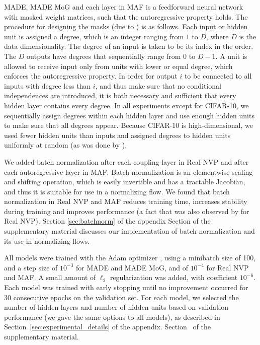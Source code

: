 MADE, MADE MoG and each layer in MAF is a feedforward neural network with masked weight matrices, such that the autoregressive property holds. The procedure for designing the masks (due to \citet{Germain:2015}) is as follows. Each input or hidden unit is assigned a degree, which is an integer ranging from $1$ to $D$, where $D$ is the data dimensionality. The degree of an input is taken to be its index in the order. The $D$ outputs have degrees that sequentially range from $0$ to $D\!-\!1$. A unit is allowed to receive input only from units with lower or equal degree, which enforces the autoregressive property. In order for output $i$ to be connected to all inputs with degree less than $i$, and thus make sure that no conditional independences are introduced, it is both necessary and sufficient that every hidden layer contains every degree. In all experiments except for CIFAR-10, we sequentially assign degrees within each hidden layer and use enough hidden units to make sure that all degrees appear. Because CIFAR-10 is high-dimensional, we used fewer hidden units than inputs and assigned degrees to hidden units uniformly at random (as was done by \citet{Germain:2015}).

We added batch normalization \citep{Ioffe:2015} after each coupling layer in Real NVP and after each autoregressive layer in MAF\@. Batch normalization is an elementwise scaling and shifting operation, which is easily invertible and has a tractable Jacobian, and thus it is suitable for use in a normalizing flow. We found that batch normalization in Real NVP and MAF reduces training time, increases stability during training and improves performance (a fact that was also observed by \citet{Dinh:2017} for Real NVP)\@.
\ifarxiv
Section \ref{sec:batchnorm} of the appendix
\else
Section  of the supplementary material
\fi
discusses our implementation of batch normalization and its use in normalizing flows.

All models were trained with the Adam optimizer \citep{Kingma:2015}, using a minibatch size of 100, and a step size of $10^{-3}$ for MADE and MADE MoG, and of $10^{-4}$ for Real NVP and MAF\@. A small amount of $\ell_2$ regularization was added, with coefficient $10^{-6}$. Each model was trained with early stopping until no improvement occurred for $30$ consecutive epochs on the validation set. For each model, we selected the number of hidden layers and number of hidden units based on validation performance (we gave the same options to all models), as described in 
\ifarxiv
Section~\ref{sec:experimental_details} of the appendix.
\else
Section~ of the supplementary material.
\fi

